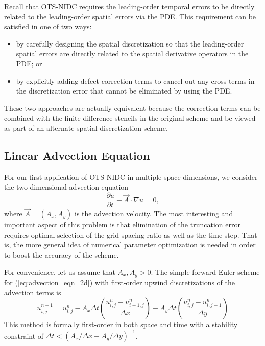 \documentclass[fleqn,12pt,twoside]{article}
\newcommand{\beq}{\begin{equation}}
\newcommand{\eeq}{\end{equation}}
\def\dt{\Delta t}
\def\dx{\Delta x}
\def\dy{\Delta y}
\begin{document}
Recall that OTS-NIDC requires the leading-order temporal errors to be directly 
related to the leading-order spatial errors via the PDE.  This requirement can 
be satisfied in one of two ways:
\begin{itemize}
\item by carefully designing the spatial discretization so that the
      leading-order spatial errors are directly related to the spatial 
      derivative operators in the PDE; or
\item by explicitly adding defect correction terms to cancel out any 
      cross-terms in the discretization error that cannot be eliminated 
      by using the PDE.
\end{itemize}
These two approaches are actually equivalent because the correction terms 
can be combined with the finite difference stencils in the original scheme 
and be viewed as part of an alternate spatial discretization scheme. 


\subsection{Linear Advection Equation}
For our first application of OTS-NIDC in multiple space dimensions, we 
consider the two-dimensional advection equation
\beq
  \frac{\partial u}{\partial t} + \vec{A} \cdot \nabla u = 0,
  \label{eq:advection_eqn_2d}
\eeq
where $\vec{A} = (A_x, A_y)$ is the advection velocity.  
The most interesting and important aspect of this problem is that elimination 
of the truncation error requires optimal selection of the grid spacing ratio 
as well as the time step.  That is, the more general idea of numerical 
parameter optimization is needed in order to boost the accuracy of the scheme.

For convenience, let us assume that $A_x, A_y > 0$.  The simple forward Euler 
scheme for (\ref{eq:advection_eqn_2d}) with first-order upwind discretizations 
of the advection terms is 
\beq
  u^{n+1}_{i,j} = u^{n}_{i,j}
  - A_x \dt \left( \frac{u^{n}_{i,j} - u^{n}_{i-1,j}}{\dx} \right)
  - A_y \dt \left( \frac{u^{n}_{i,j} - u^{n}_{i,j-1}}{\dy} \right)
  \label{eq:advection_eqn_2d_FD_scheme}
\eeq
This method is formally first-order in both space and time with a 
stability constraint of $\dt < \left( A_x/\dx + A_y/\dy \right)^{-1}$.
\end{document}
